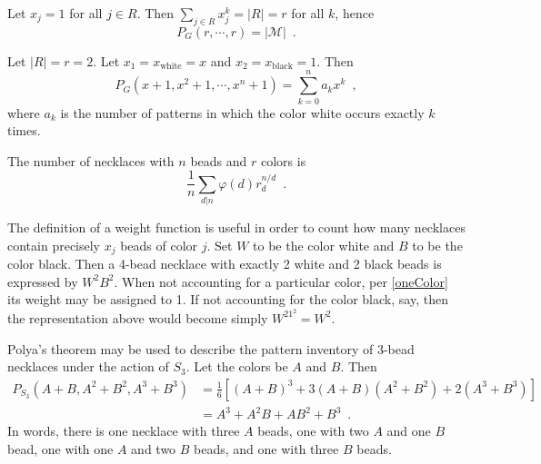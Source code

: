 \begin{corollary}
	\cite[89]{Aigner2007}
	\cite[254]{Tucker1974}
	Let $x_j = 1$ for all $j \in R$. Then $\sum_{j \in R} x_j^k = |R| = r$ for all $k$, hence
	\begin{equation}
		P_G(r, \cdots, r) = |\mathcal{M}| \enspace.
	\end{equation}
\end{corollary}

\begin{corollary}
	\label{oneColor}
	\cite[89]{Aigner2007}
	Let $|R| = r = 2$. Let $x_1 = x_{\text{white}} = x$ and
	$x_2 = x_{\text{black}} = 1$. Then
	\begin{equation}
		P_G(x + 1, x^2 + 1, \cdots, x^n + 1) = \sum_{k = 0}^n a_k x^k \enspace,
	\end{equation}
	where $a_k$ is the number of patterns in which the color white occurs exactly $k$ times.
\end{corollary}

\begin{example}
	\cite[89]{Aigner2007}
	The number of necklaces with $n$ beads and $r$ colors is
	\begin{equation}
		\frac{1}{n} \sum_{d | n} \varphi(d) r_d^{n / d} \enspace.
	\end{equation}
\end{example}

\begin{example}
	\cite[86]{Aigner2007}
	The definition of a weight function is useful in order to count how many necklaces
	contain precisely $x_j$ beads of color $j$. Set $W$ to be the color white and $B$
	to be the color black. Then a 4-bead necklace with exactly 2 white and 2 black beads
	is expressed by $W^2B^2$. When not accounting for a particular color,
	per \ref{oneColor} its weight may be assigned to 1. If not accounting for the color
	black, say, then the representation above would become simply $W^21^2 = W^2$.
\end{example}

\pagebreak
\begin{example}
	Polya's theorem may be used to describe the pattern inventory of 3-bead necklaces under
	the action of $S_3$. Let the colors be $A$ and $B$. Then
		\begin{align}
			P_{S_3}(A + B, A^2 + B^2, A^3 + B^3)
			& = \frac{1}{6}[(A + B)^3 + 3 (A + B) (A^2 + B^2) + 2 (A^3 + B^3)] \\
			& = A^3 + A^2 B + A B^2 + B^3 \enspace.
		\end{align}
	In words, there is one necklace with three $A$ beads, one with two $A$ and one $B$ bead,
	one with one $A$ and two $B$ beads, and one with three $B$ beads.
\end{example}

